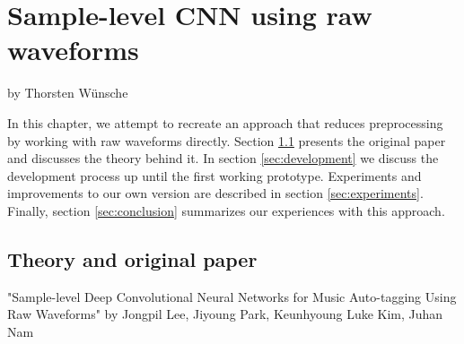 \chapter{Sample-level CNN using raw waveforms}
by Thorsten Wünsche

\bigskip

In this chapter, we attempt to recreate an approach that reduces preprocessing by working with raw waveforms directly. Section \ref{sec:theory} presents the original paper and discusses the theory behind it. In section \ref{sec:development} we discuss the development process up until the first working prototype. Experiments and improvements to our own version are described in section \ref{sec:experiments}. Finally, section \ref{sec:conclusion} summarizes our experiences with this approach.

\section{Theory and original paper}
\label{sec:theory}

"Sample-level Deep Convolutional Neural Networks for Music Auto-tagging Using Raw Waveforms" \cite{DBLP:journals/corr/LeePKN17} by Jongpil Lee, Jiyoung Park, Keunhyoung Luke Kim, Juhan Nam


